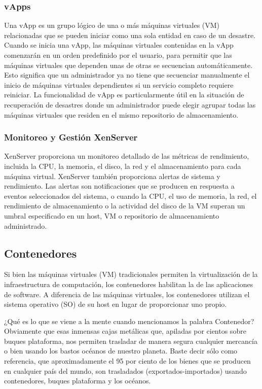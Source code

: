 \documentclass[preprint,12pt]{elsarticle}
\begin{document}
\subsubsection{\textbf{vApps}}
Una vApp es un grupo lógico de una o más máquinas virtuales (VM) relacionadas que se pueden iniciar como una sola entidad en caso de un desastre. Cuando se inicia una vApp, las máquinas virtuales contenidas en la vApp comenzarán en un orden predefinido por el usuario, para permitir que las máquinas virtuales que dependen unas de otras se secuencian automáticamente. Esto significa que un administrador ya no tiene que secuenciar manualmente el inicio de máquinas virtuales dependientes si un servicio completo requiere reiniciar.  La funcionalidad de vApp es particularmente útil en la situación de recuperación de desastres donde un administrador puede elegir agrupar todas las máquinas virtuales que residen en el mismo repositorio de almacenamiento.

\subsubsection{\textbf{Monitoreo y Gestión XenServer}}
XenServer proporciona un monitoreo detallado de las métricas de rendimiento, incluida la CPU, la memoria, el disco, la red  y el almacenamiento para cada máquina virtual.
XenServer también proporciona alertas de sistema y rendimiento. Las alertas son notificaciones que se producen en respuesta a eventos seleccionados del sistema, o cuando la CPU, el uso de memoria, la red, el rendimiento de almacenamiento o la actividad del disco de la VM superan un umbral especificado en un host, VM o repositorio de almacenamiento administrado.\cite{Citrix2018}


\subsection{\textbf{Contenedores}}

Si bien las máquinas virtuales (VM) tradicionales permiten la virtualización de la infraestructura de computación, los contenedores habilitan la de las aplicaciones de software. A diferencia de las máquinas virtuales, los contenedores utilizan el sistema operativo (SO) de su host en lugar de proporcionar uno propio.

¿Qué es lo que se viene a la mente cuando mencionamos la palabra Contenedor? Obviamente que esas inmensas cajas metálicas que, apiladas por cientos sobre buques plataforma, nos permiten trasladar de manera segura cualquier mercancía o bien usando los bastos océanos de nuestro planeta. Baste decir sólo como referencia, que aproximadamente el 95 por ciento de los bienes que se producen en cualquier país del mundo, son trasladados (exportados-importados) usando contenedores, buques plataforma y los océanos.
\end{document}

